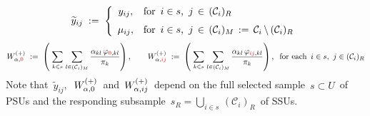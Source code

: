 \begin{equation*}
\widetilde{y}_{ij}
\; := \;
    \left\{\begin{array}{cl}
        y_{ij}, & \textnormal{for \,$i \in s$,\, $j \,\in\, (\mathcal{C}_{i})_{R}$}
        \\
        \overset{{\color{white}\textnormal{\large1}}}{\mu_{ij}}, & \textnormal{for \,$i \in s$,\, $j \,\in\, (\mathcal{C}_{i})_{M} \,:=\, \mathcal{C}_{i} \,\backslash\, (\mathcal{C}_{i})_{R}$}
        \end{array}\right.
\end{equation*}
\begin{equation*}
W^{(+)}_{\alpha,{\color{red}0}}
\; := \;
    \left(\;
        \underset{k \in s}{\sum}\;
        \underset{l \in (\mathcal{C}_{i})_{M}}{\sum}\,
        \dfrac{
            \alpha_{kl}\,\varphi_{{\color{red}0},kl}
            }{
            \pi_{k}
            }
        \right),
\quad\quad
W^{(+)}_{\alpha,{\color{red}ij}}
\; := \;
    \left(\;
        \underset{k \in s}{\sum}\;
        \underset{l \in (\mathcal{C}_{i})_{M}}{\sum}\,
        \dfrac{
            \alpha_{kl}\,\varphi_{{\color{red}ij},kl}
            }{
            \pi_{k}
            }
        \right),
\;\;
\textnormal{for each \,$i \in s$,\, $j \in (\mathcal{C}_{i})_{R}$}
\end{equation*}
\vskip 0.3cm
\noindent
Note that
\,$\widetilde{y}_{ij}$,\,
\,$W^{(+)}_{\alpha,{\color{black}0}}$\,
and
\,$W^{(+)}_{\alpha,{\color{black}ij}}$\,
depend on the full selected sample
\,$s \subset U$\,
of PSUs and the responding subsample
\,$s_{R} = \underset{i \in s}{\bigcup}\,(\mathcal{C}_{i})_{R}$\,
of SSUs.
